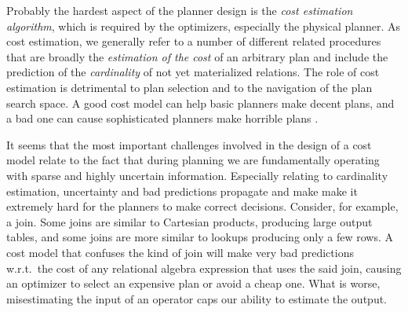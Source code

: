 
Probably the hardest aspect of the planner design is the \emph{cost
estimation algorithm}, which is required by the optimizers, especially
the physical planner.  As cost
estimation, we generally refer to a number of different related
procedures that are broadly the \emph{estimation of the cost} of an
arbitrary plan and include the prediction of the \emph{cardinality} of
not yet materialized relations. The role of cost estimation is
detrimental to plan selection and
to the navigation of the plan search space. A good cost model can help basic
planners make decent plans, and a bad one can cause sophisticated
planners make horrible plans \cite{leisHowGoodAre2015}.

It seems that the most important challenges involved in the design of
a cost model relate to the fact that during planning we are fundamentally operating
with sparse and highly uncertain information. Especially relating to
cardinality estimation, uncertainty and bad predictions propagate and
make make it extremely hard for the planners to make correct
decisions. Consider, for example, a join. Some joins are similar to
Cartesian products, producing large output tables, and some joins are
more similar to lookups producing only a few rows. A cost model that
confuses the kind of join will make very bad predictions w.r.t.\ the
cost of any relational algebra expression that uses the said join,
causing an optimizer to select an expensive plan or avoid a cheap
one. What is worse, misestimating the input of an operator caps our
ability to estimate the output.

